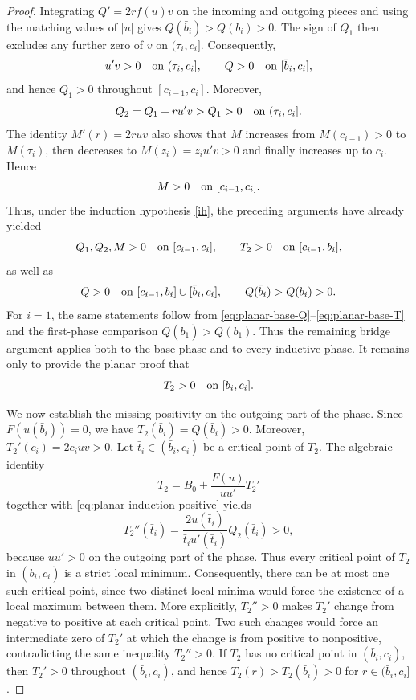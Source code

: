 \documentclass[11pt]{article}
\begin{document}
\begin{proof}
Integrating $Q'=2rf(u)v$ on the incoming and outgoing pieces and using
the matching values of $|u|$ gives $Q(\bar b_i)>Q(b_i)>0$.
The sign of $Q_1$ then excludes any further zero of $v$ on
$(\tau_i,c_i]$.
Consequently,
\[
u'v>0\quad\hbox{on }(\tau_i,c_i],
\qquad
Q>0\quad\hbox{on }[\bar b_i,c_i],
\]
and hence \(Q_1>0\) throughout \([c_{i-1},c_i]\). Moreover,
\[
Q_2=Q_1+ru'v>Q_1>0
\quad\hbox{on }(\tau_i,c_i].
\]
The identity $M'(r)=2ruv$ also
shows that \(M\) increases from \(M(c_{i-1})>0\) to \(M(\tau_i)\),
then decreases to $M(z_i)=z_iu'v>0$
and finally increases up to \(c_i\). Hence
\[
M>0\quad\hbox{on }[c_{i-1},c_i].
\]
Thus, under the induction hypothesis \eqref{ih}, the preceding arguments have
already yielded
\begin{equation}\label{eq:planar-induction-positive}
Q_1,Q_2,M>0
\quad\hbox{on }[c_{i-1},c_i],
\qquad
T_2>0
\quad\hbox{on }[c_{i-1},b_i],
\end{equation}
as well as
\begin{equation*}
Q>0
\quad\hbox{on }[c_{i-1},b_i]\cup[\bar b_i,c_i],
\qquad
Q(\bar b_i)>Q(b_i)>0.
\end{equation*}
For $i=1$, the same statements follow from
\eqref{eq:planar-base-Q}--\eqref{eq:planar-base-T} and the first-phase
comparison $Q(\bar b_1)>Q(b_1)$. Thus the remaining bridge argument applies
both to the base phase and to every inductive phase.
It remains only to provide the planar proof that
\begin{equation}\label{key}
T_2>0\quad\hbox{on }[\bar b_i,c_i].
\end{equation}



We now establish the missing positivity on the outgoing part of the phase.
Since $F(u(\bar b_i))=0$, we have $T_2(\bar b_i)=Q(\bar b_i)>0$. Moreover, $T_2'(c_i)=2c_i uv>0$. Let $\bar t_i\in(\bar b_i,c_i)$ be a critical point of $T_2$. The algebraic identity
\cite[Lemma~3.4]{LiuSunZou}
\begin{equation*}
 T_2=B_0+\frac{F(u)}{uu'}T_2'
\end{equation*}
together with \eqref{eq:planar-induction-positive} yields
\begin{equation*}
 T_2''(\bar t_i)
 =\frac{2u(\bar t_i)}{\bar t_i u'(\bar t_i)}Q_2(\bar t_i)>0,
\end{equation*}
because $uu'>0$ on the outgoing part of the phase. Thus every critical point of $T_2$ in $(\bar b_i,c_i)$ is a strict local minimum. Consequently, there can be at most one such critical point, since two distinct local minima would force the existence of a local maximum between them.
More explicitly, $T_2''>0$ makes $T_2'$ change from negative to positive
at each critical point.  Two such changes would force an intermediate zero
of $T_2'$ at which the change is from positive to nonpositive, contradicting
the same inequality $T_2''>0$.
If $T_2$ has no critical point in $(\bar b_i,c_i)$, then $T_2'>0$ throughout $(\bar b_i,c_i)$, and hence
$T_2(r)>T_2(\bar b_i)>0$ for $r\in(\bar b_i,c_i]$.


\end{proof}
\end{document}
